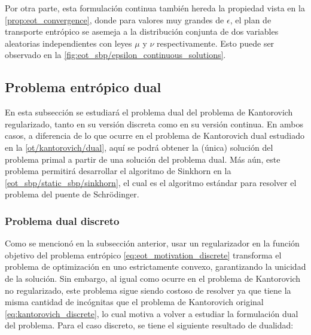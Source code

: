 Por otra parte, esta formulación continua también hereda la propiedad vista en la \autoref{prop:eot_convergence}, donde para valores muy grandes de $\epsilon$, el plan de transporte entrópico se asemeja a la distribución conjunta de dos variables aleatorias independientes con leyes $\mu$ y $\nu$ respectivamente. Esto puede ser observado en la \autoref{fig:eot_sbp/epsilon_continuous_solutions}.


\subsection{Problema entrópico dual}
\label{eot_sbp/regularized/eot_dual}

En esta subsección se estudiará el problema dual del problema de Kantorovich regularizado, tanto en su versión discreta como en su versión continua. En ambos casos, a diferencia de lo que ocurre en el problema de Kantorovich dual estudiado en la \autoref{ot/kantorovich/dual}, aquí se podrá obtener la (única) solución del problema primal a partir de una solución del problema dual. Más aún, este problema permitirá desarrollar el algoritmo de Sinkhorn en la \autoref{eot_sbp/static_sbp/sinkhorn}, el cual es el algoritmo estándar para resolver el problema del puente de Schrödinger.

\subsubsection{Problema dual discreto}

Como se mencionó en la subsección anterior, usar un regularizador en la función objetivo del problema entrópico \eqref{eq:eot_motivation_discrete} transforma el problema de optimización en uno estrictamente convexo, garantizando la unicidad de la solución. Sin embargo, al igual como ocurre en el problema de Kantorovich no regularizado, este problema sigue siendo costoso de resolver ya que tiene la misma cantidad de incógnitas que el problema de Kantorovich original \eqref{eq:kantorovich_discrete}, lo cual motiva a volver a estudiar la formulación dual del problema. Para el caso discreto, se tiene el siguiente resultado de dualidad:


